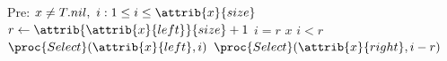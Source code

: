 \begin{codebox}
\zi \Comment Pre: $x \neq T.nil, \ i : 1 \leq i \leq \attrib{x}{size}$
\li $r \gets \attrib{\attrib{x}{left}}{size} + 1$
\li \If $i = r$
\li \Then
        \Return $x$
\li \Else \If $i < r$
\li     \Return $\proc{Select}(\attrib{x}{left},i)$
\li \Else 
\li     \Return $\proc{Select}(\attrib{x}{right},i-r)$
    \End
\end{codebox}
